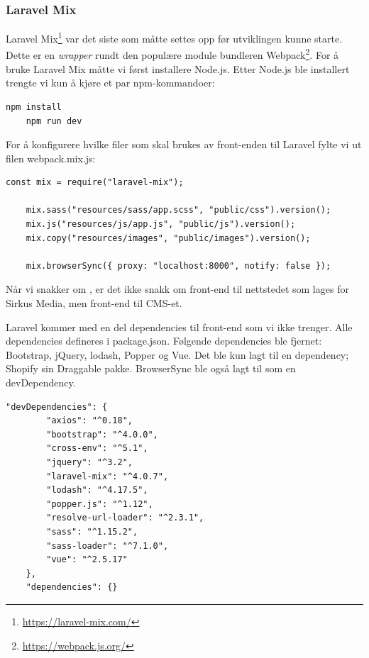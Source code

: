 \subsubsection{Laravel Mix}
Laravel Mix\footnote{\url{https://laravel-mix.com/}} var det siste som måtte settes opp før utviklingen kunne starte. Dette er en \textit{wrapper} rundt den populære module bundleren Webpack\footnote{\url{https://webpack.js.org/}}. For å bruke Laravel Mix måtte vi først installere Node.js. Etter Node.js ble installert trengte vi kun å kjøre et par npm-kommandoer:
\begin{lstlisting}[caption={npm-kommando for å sette opp front-end til Laravel}, language=bash]
    npm install
    npm run dev
\end{lstlisting}

For å konfigurere hvilke filer som skal brukes av front-enden til Laravel fylte vi ut filen webpack.mix.js:
\begin{lstlisting}[caption={Eksempel på oppsett av webpack.mix.js}]
    const mix = require("laravel-mix");

    mix.sass("resources/sass/app.scss", "public/css").version();
    mix.js("resources/js/app.js", "public/js").version();
    mix.copy("resources/images", "public/images").version();

    mix.browserSync({ proxy: "localhost:8000", notify: false });
\end{lstlisting}

Når vi snakker om , er det ikke snakk om front-end til nettstedet som lages for Sirkus Media, men front-end til CMS-et.

Laravel kommer med en del dependencies til front-end som vi ikke trenger. Alle dependencies defineres i package.json. Følgende dependencies ble fjernet: Bootstrap, jQuery, lodash, Popper og Vue. Det ble kun lagt til en dependency; Shopify sin Draggable pakke. BrowserSync ble også lagt til som en devDependency.

\begin{lstlisting}[caption={Orginal package.json}]
    "devDependencies": {
        "axios": "^0.18",
        "bootstrap": "^4.0.0",
        "cross-env": "^5.1",
        "jquery": "^3.2",
        "laravel-mix": "^4.0.7",
        "lodash": "^4.17.5",
        "popper.js": "^1.12",
        "resolve-url-loader": "^2.3.1",
        "sass": "^1.15.2",
        "sass-loader": "^7.1.0",
        "vue": "^2.5.17"
    },
    "dependencies": {}
\end{lstlisting}

